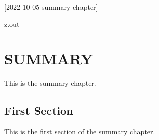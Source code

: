 [2022-10-05 summary chapter]

\begin{VerbatimOut}{z.out}
\chapter{SUMMARY}

This is the summary chapter.


\section{First Section}

This is the first section of the summary chapter.
\end{VerbatimOut}

\MyIO
